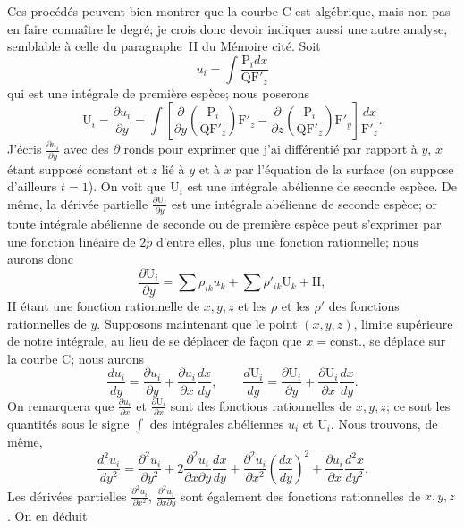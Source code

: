 \documentclass{article}
\begin{document}
Ces procédés peuvent bien montrer que la courbe $\mathrm{C}$ est algébrique, mais non pas en faire connaître le degré; je crois donc devoir indiquer aussi une autre analyse, semblable à celle du paragraphe~II du Mémoire cité. Soit
\[
u_{i} = \int \frac{\mathrm{P}_{i} dx}{\mathrm{Q}\mathrm{F}'_{z}}
\]
qui est une intégrale de première espèce; nous poserons
\[
\mathrm{U}_{i} = \frac{\partial u_{i}}{\partial y} = \int \left[ \frac{\partial}{\partial y}\left(\frac{\mathrm{P}_{i}}{\mathrm{Q}\mathrm{F}'_{z}}\right)\mathrm{F}'_{z} - \frac{\partial}{\partial z}\left(\frac{\mathrm{P}_{i}}{\mathrm{Q}\mathrm{F}'_{z}}\right)\mathrm{F}'_{y} \right] \frac{dx}{\mathrm{F}'_{z}}.
\]
J'écris $\frac{\partial u_{i}}{\partial y}$ avec des $\partial$ ronds pour exprimer que j'ai différentié par rapport
à $y$, $x$ étant supposé constant et $z$ lié à $y$ et à $x$ par l'équation de la surface (on suppose d'ailleurs $t = 1$). On voit que $\mathrm{U}_{i}$ est une intégrale abélienne de seconde espèce. De même, la dérivée partielle $\frac{\partial \mathrm{U}_{i}}{\partial y}$ est une intégrale abélienne de seconde espèce; or toute intégrale abélienne de seconde ou de première espèce peut s'exprimer par une fonction linéaire de $2p$ d'entre elles, plus une fonction rationnelle; nous aurons donc
\[
\frac{\partial \mathrm{U}_{i}}{\partial y} = \sum \rho_{ik} u_{k} + \sum \rho'_{ik} \mathrm{U}_{k} + \mathrm{H},
\]
$\mathrm{H}$ étant une fonction rationnelle de $x, y, z$ et les $\rho$ et les $\rho'$ des fonctions rationnelles de $y$. Supposons maintenant que le point $(x, y, z)$, limite supérieure de notre intégrale, au lieu de se déplacer de façon que $x = \mathrm{const.}$, se déplace sur la courbe $\mathrm{C}$; nous aurons
\[
\frac{du_{i}}{dy} = \frac{\partial u_{i}}{\partial y} + \frac{\partial u_{i}}{\partial x}\frac{dx}{dy}, \qquad \frac{d\mathrm{U}_{i}}{dy} = \frac{\partial \mathrm{U}_{i}}{\partial y} + \frac{\partial \mathrm{U}_{i}}{\partial x}\frac{dx}{dy}.
\]
On remarquera que $\frac{\partial u_{i}}{\partial x}$ et $\frac{\partial \mathrm{U}_{i}}{\partial x}$ sont des fonctions rationnelles de $x, y, z$; ce sont les quantités sous le signe $\displaystyle\int$ des intégrales abéliennes $u_{i}$ et $\mathrm{U}_{i}$. Nous trouvons, de même,
\[
\frac{d^{2}u_{i}}{dy^{2}} = \frac{\partial^{2}u_{i}}{\partial y^{2}} + 2 \frac{\partial^{2}u_{i}}{\partial x \partial y}\frac{dx}{dy} + \frac{\partial^{2}u_{i}}{\partial x^{2}}\left(\frac{dx}{dy}\right)^{2} + \frac{\partial u_{i}}{\partial x}\frac{d^{2}x}{dy^{2}}.
\]
Les dérivées partielles $\frac{\partial^{2}u_{i}}{\partial x^{2}}$, $\frac{\partial^{2}u_{i}}{\partial x \partial y}$ sont également des fonctions rationnelles de $x, y, z$. On en déduit
\end{document}
